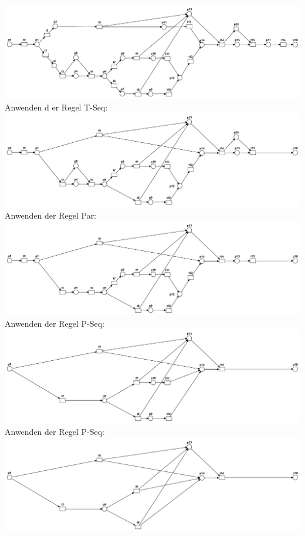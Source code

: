 \includegraphics[scale=0.3]{Teilaufgaben/vorlage.pdf}\\
 Anwenden d	er Regel T-Seq:\\
 \includegraphics[scale=0.3]{Teilaufgaben/tseq1.pdf}\\
 
  Anwenden der Regel Par:\\
 \includegraphics[scale=0.3]{Teilaufgaben/par1.pdf}\\
 
   Anwenden der Regel P-Seq:\\
 \includegraphics[scale=0.3]{Teilaufgaben/pseq1.pdf}\\
 
    Anwenden der Regel P-Seq:\\
 \includegraphics[scale=0.3]{Teilaufgaben/pseq2.pdf}\\
 
